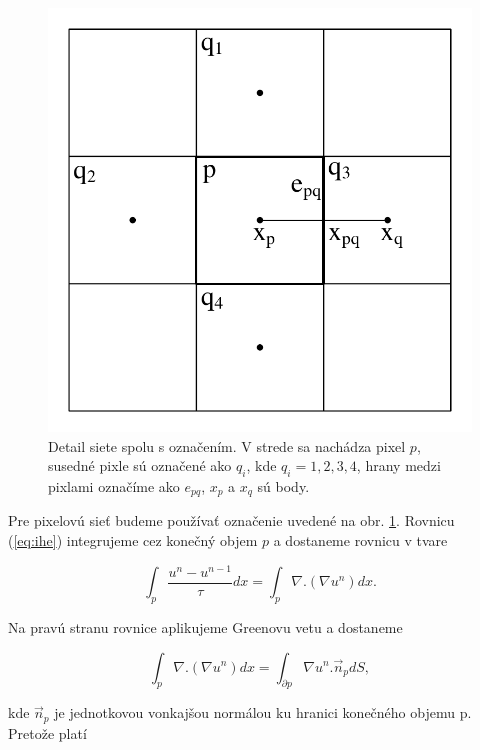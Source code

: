 \documentclass[a4paper,11pt,oneside]{article}%
\begin{document}
\begin{figure}[h!]
 \begin{center} 
 \includegraphics[scale=0.40]{pics/hrany1.pdf}
\caption{Detail siete spolu s označením. V strede sa nachádza pixel $p$, susedné pixle sú označené ako $q_i$, kde $q_i = 1, 2, 3, 4$, hrany medzi pixlami označíme ako $e_{pq}$, $x_p$ a $x_q$ sú body. }
\label{fig:hrany}
\end{center} 
\end{figure}

Pre pixelovú sieť budeme používať označenie uvedené na obr. \ref{fig:hrany}.
Rovnicu (\ref{eq:ihe}) integrujeme cez konečný objem $p$ a dostaneme rovnicu v tvare

\begin{equation} 
\int_p\frac{u^n - u^{n-1}}{\tau} dx = \int_p\nabla . (\nabla u^n)dx.
\end{equation}

Na pravú stranu rovnice aplikujeme Greenovu vetu a dostaneme

\begin{equation} 
\int_p\nabla . (\nabla u^n)dx = \int_{\partial p} \nabla u^n . \vec{n}_pdS,
\end{equation}

kde $\vec{n}_p$ je jednotkovou vonkajšou normálou ku hranici konečného objemu p.
Pretože platí
\end{document}
